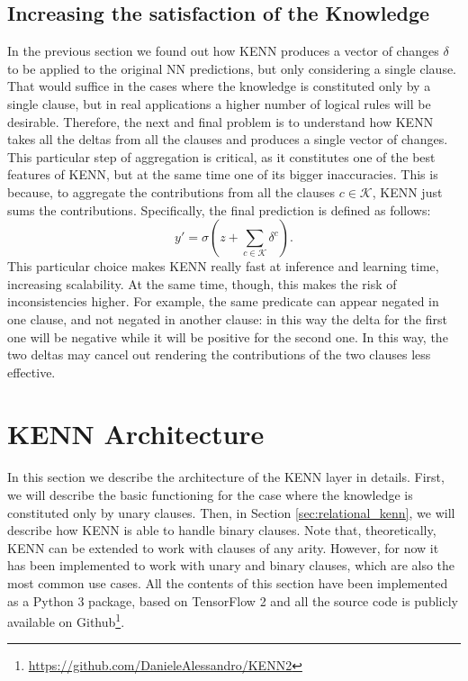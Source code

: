 \subsection{Increasing the satisfaction of the Knowledge}
In the previous section we found out how KENN produces a vector of changes $\delta$ to be applied to the original NN predictions, but only considering a single clause. That would suffice in the cases where the knowledge is constituted only by a single clause, but in real applications a higher number of logical rules will be desirable. Therefore, the next and final problem is to understand how KENN takes all the deltas from all the clauses and produces a single vector of changes. This particular step of aggregation is critical, as it constitutes one of the best features of KENN, but at the same time one of its bigger inaccuracies. This is because, to aggregate the contributions from all the clauses $c \in \mathcal{K}$, KENN just sums the contributions. Specifically, the final prediction is defined as follows:
\begin{equation}
\label{eq:deltas_sum}
y'=\sigma(z + \sum_{c\in\mathcal{K}}\delta^c).
\end{equation}
This particular choice makes KENN really fast at inference and learning time, increasing scalability. At the same time, though, this makes the risk of inconsistencies higher. For example, the same predicate can appear negated in one clause, and not negated in another clause: in this way the delta for the first one will be negative while it will be positive for the second one. In this way, the two deltas may cancel out rendering the contributions of the two clauses less effective.


\section{KENN Architecture}
\label{sec:kenn_architecture}
In this section we describe the architecture of the KENN layer in details. First, we will describe the basic functioning for the case where the knowledge is constituted only by unary clauses. Then, in Section \ref{sec:relational_kenn}, we will describe how KENN is able to handle binary clauses. Note that, theoretically, KENN can be extended to work with clauses of any arity. However, for now it has been implemented to work with unary and binary clauses, which are also the most common use cases. All the contents of this section have been implemented as a Python 3 package, based on TensorFlow 2 \cite{abadi2016tensorflow} and all the source code is publicly available on Github\footnote{\url{https://github.com/DanieleAlessandro/KENN2}}.

